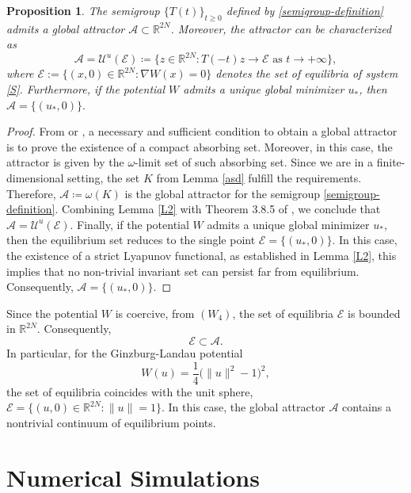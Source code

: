 \documentclass[12pt]{amsart}
\numberwithin{equation}{section}
\newtheorem{proposition}[theorem]{Proposition}
\begin{document}
\begin{proposition}
The semigroup $\{T(t)\}_{t\ge 0}$ defined by \eqref{semigroup-definition} admits a global attractor $\mathcal{A} \subset \mathbb{R}^{2N}$. Moreover, the attractor can be characterized as
$$
\mathcal{A} = \mathcal{U}^u(\mathcal{E})\coloneqq\{z\in \mathbb{R}^{2N}:T(-t)z\to \mathcal{E}\text{ as }t\to +\infty\},
$$
where $\mathcal{E}:=\{(x,0)\in\mathbb{R}^{2N}:\nabla W (x)=0\}$ denotes the set of equilibria of system \eqref{S}. Furthermore, if the potential $W$ admits a unique global minimizer $u_*$, then $\mathcal{A}= \{(u_*,0)\}.$
\end{proposition}
\begin{proof}
From \cite[Theorem 1.1]{Temam} or \cite[Corollary 2.13]{Livro-Alexandre}, a necessary and sufficient condition to obtain a global attractor is to prove the existence of a compact absorbing set. Moreover, in this case, the attractor is given by the $\omega$-limit set of such absorbing set. Since we are in a finite-dimensional setting, the set $K$ from Lemma  \ref{asd} fulfill the requirements. Therefore, $\mathcal{A} \coloneqq \omega (K)$ is the global attractor for the semigroup \eqref{semigroup-definition}. Combining Lemma \ref{L2} with Theorem 3.8.5 of \cite{Hale}, we conclude that $\mathcal{A} = \mathcal{U}^u(\mathcal{E})$. Finally, if the potential $W$ admits a unique global minimizer $u_*$, then the equilibrium set reduces to the single point $\mathcal{E}=\{(u_*,0)\}$. In this case, the existence of a strict Lyapunov functional, as established in Lemma \ref{L2}, this implies that no non-trivial invariant set can persist far from equilibrium. Consequently, $\mathcal{A}=\{(u_*,0)\}$.
\end{proof}

Since the potential $W$ is coercive, from \hyperlink{W4}{$(W_4)$}, the set of equilibria $\mathcal{E}$ is bounded in $\mathbb{R}^{2N}$. Consequently, 
$$
\mathcal{E} \subset \mathcal{A}.
$$
In particular, for the Ginzburg-Landau potential
$$
W(u)=\frac{1}{4}\big(\|u\|^2-1\big)^2,
$$
the set of equilibria coincides with the unit sphere, $\mathcal{E}=\{(u,0)\in\mathbb{R}^{2N} : \|u\|=1\}$. In this case, the global attractor $\mathcal{A}$ contains a nontrivial continuum of equilibrium points.


\section{Numerical Simulations}\label{Sec5}
\end{document}

